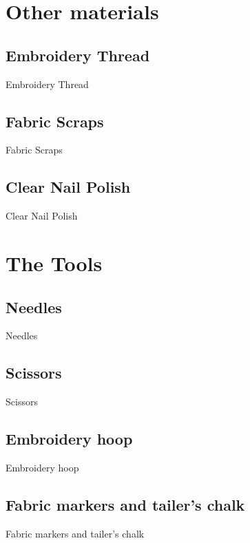 \documentclass{beamer}
\begin{document}
\section{Other materials}
\frame{\tableofcontents[hideothersubsections,sectionstyle=show/hide]}
\subsection{Embroidery Thread}
\begin{frame}[fragile]{Embroidery Thread}
\end{frame}
\subsection{Fabric Scraps}
\begin{frame}[fragile]{Fabric Scraps}
\end{frame}
\subsection{Clear Nail Polish}
\begin{frame}[fragile]{Clear Nail Polish}
\end{frame}
\section{The Tools}
\frame{\tableofcontents[hideothersubsections,sectionstyle=show/hide]}
\subsection{Needles}
\begin{frame}[fragile]{Needles}
\end{frame}
\subsection{Scissors}
\begin{frame}[fragile]{Scissors}
\end{frame}
\subsection{Embroidery hoop}
\begin{frame}[fragile]{Embroidery hoop}
\end{frame}
\subsection{Fabric markers and tailer's chalk}
\begin{frame}[fragile]{Fabric markers and tailer's chalk}
\end{frame}
\end{document}
